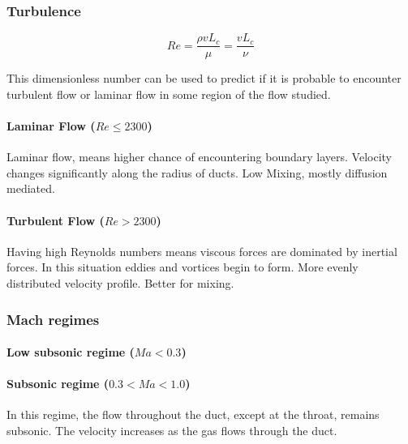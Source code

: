 \newpage

\subsubsection{Turbulence}

$$
Re = \frac{\rho v L_c}{\mu} = \frac{v L_c}{\nu}
$$

	This dimensionless number can be used to predict if it is probable to encounter turbulent flow or laminar flow in some region of the flow studied.

\paragraph{Laminar Flow (\(Re \le 2300\))}

	Laminar flow, means higher chance of encountering boundary layers. Velocity changes significantly along the radius of ducts. Low Mixing, mostly diffusion mediated.


\paragraph{Turbulent Flow (\(Re > 2300\))}

	Having high Reynolds numbers means viscous forces are dominated by inertial forces. In this situation eddies and vortices begin to form. More evenly distributed velocity profile. Better for mixing. 

\newpage

\subsubsection{Mach regimes}

\paragraph{Low subsonic regime (\(Ma < 0.3\))}

\paragraph{Subsonic regime (\(0.3 < Ma < 1.0\))} 

	In this regime, the flow throughout the duct, except at the throat, remains subsonic. The velocity increases as the gas flows through the duct.\\

